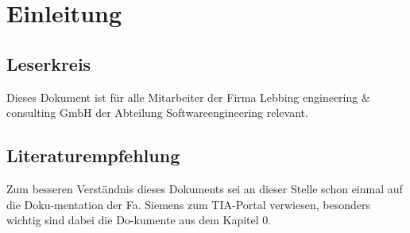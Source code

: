 \section{Einleitung}
\subsection{Leserkreis}
Dieses Dokument ist für alle Mitarbeiter der Firma Lebbing engineering \& consulting GmbH der Abteilung Softwareengineering relevant.

\subsection{Literaturempfehlung}
Zum besseren Verständnis dieses Dokuments sei an dieser Stelle schon einmal auf die Doku-mentation der Fa. Siemens zum TIA-Portal verwiesen, besonders wichtig sind dabei die Do-kumente aus dem Kapitel 0.